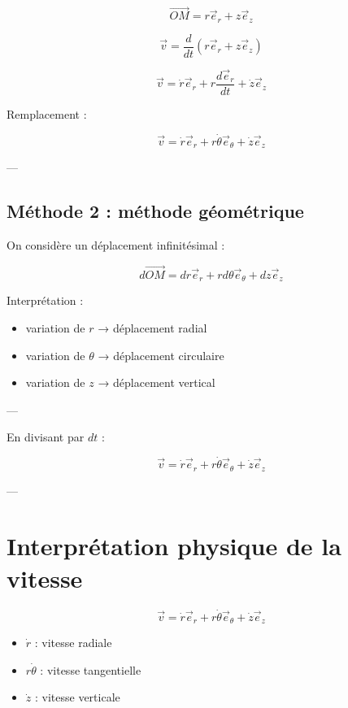 \documentclass[11pt,a4paper]{article}
\begin{document}
\[
\vec{OM} = r\vec{e}_r + z\vec{e}_z
\]

\[
\vec{v} = \frac{d}{dt}(r\vec{e}_r + z\vec{e}_z)
\]

\[
\vec{v} = \dot{r}\vec{e}_r + r\frac{d\vec{e}_r}{dt} + \dot{z}\vec{e}_z
\]

Remplacement :

\[
\vec{v} = \dot{r}\vec{e}_r + r\dot{\theta}\vec{e}_\theta + \dot{z}\vec{e}_z
\]

---

\subsection{Méthode 2 : méthode géométrique}

On considère un déplacement infinitésimal :

\[
d\vec{OM} = dr\vec{e}_r + r d\theta \vec{e}_\theta + dz\vec{e}_z
\]

\bigskip

 Interprétation :

\begin{itemize}
\item variation de $r$ → déplacement radial
\item variation de $\theta$ → déplacement circulaire
\item variation de $z$ → déplacement vertical
\end{itemize}

---

En divisant par $dt$ :

\[
\vec{v} =
\dot{r}\vec{e}_r + r\dot{\theta}\vec{e}_\theta + \dot{z}\vec{e}_z
\]

---

\section{Interprétation physique de la vitesse}

\[
\vec{v} =
\dot{r}\vec{e}_r + r\dot{\theta}\vec{e}_\theta + \dot{z}\vec{e}_z
\]

\bigskip

\begin{itemize}
\item $\dot{r}$ : vitesse radiale
\item $r\dot{\theta}$ : vitesse tangentielle
\item $\dot{z}$ : vitesse verticale
\end{itemize}
\end{document}
